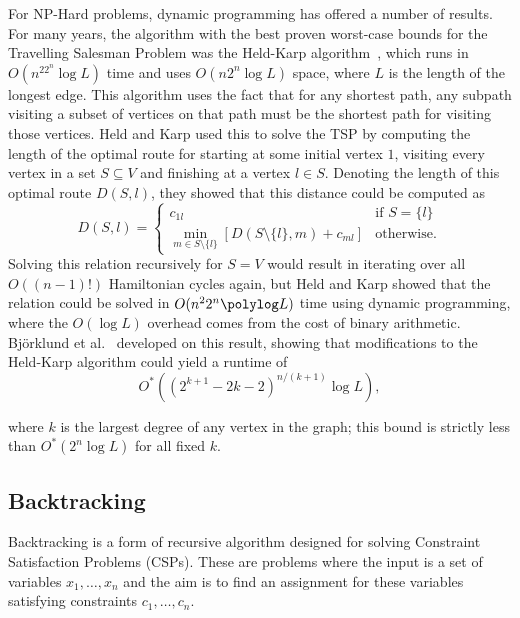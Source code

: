 For NP-Hard problems, dynamic programming has offered a number of results. For many years, the algorithm with the best proven worst-case bounds for the Travelling Salesman Problem was the Held-Karp algorithm~\cite{held1962}, which runs in $O(n^22^n\log L)$ time and uses $O(n2^n\log L)$ space, where $L$ is the length of the longest edge. This algorithm uses the fact that for any shortest path, any subpath visiting a subset of vertices on that path must be the shortest path for visiting those vertices. Held and Karp used this to solve the TSP by computing the length of the optimal route for starting at some initial vertex $1$, visiting every vertex in a set $S \subseteq V$ and finishing at a vertex $l \in S$. Denoting the length of this optimal route $D(S, l)$, they showed that this distance could be computed as
%
\begin{equation}
D(S, l) = \begin{cases} c_{1l} & \text{if } S = \{l\}\\
          \min_{m \in S \setminus \{l\}}\left[D(S \setminus \{l\}, m) + c_{ml}\right] & \text{otherwise.}
  \end{cases}
\end{equation}
%
Solving this relation recursively for $S=V$ would result in iterating over all $O((n-1)!)$ Hamiltonian cycles again, but Held and Karp showed that the relation could be solved in $O(n^22^n\polylog L)$ time using dynamic programming, where the $O(\log L)$ overhead comes from the cost of binary arithmetic. Bj{\"o}rklund et al.\ \cite{bjorklund2008} developed on this result, showing that modifications to the Held-Karp algorithm could yield a runtime of
%
\begin{equation}
O^*((2^{k + 1} - 2k - 2)^{n/(k + 1)}\log L),
\end{equation}

\noindent where $k$ is the largest degree of any vertex in the graph; this bound is strictly less than $O^*(2^n\log L)$ for all fixed $k$.

\subsection{Backtracking}
\label{sec:backtrack}

Backtracking is a form of recursive algorithm designed for solving Constraint Satisfaction Problems (CSPs). These are problems where the input is a set of variables $x_1,\dots,x_n$ and the aim is to find an assignment for these variables satisfying constraints $c_1,\dots,c_n$.

